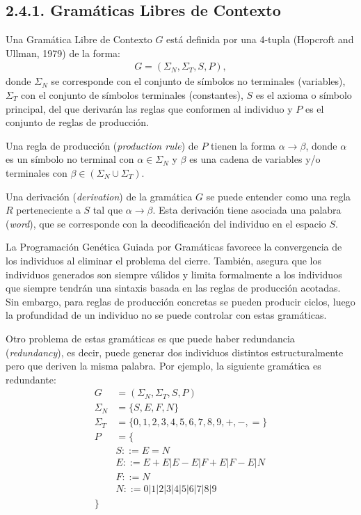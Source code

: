 \documentclass[spanish,a4paper,12pt,twoside]{report}
\begin{document}
    \subsection*{\large 2.4.1. Gramáticas Libres de Contexto}
    Una Gramática Libre de Contexto $G$ está definida por una 4-tupla (Hopcroft and Ullman, 1979) de la forma: 
    \begin{align}
    G = (\Sigma_{N}, \Sigma_{T}, S, P), \label{eq:1}\tag{1}
    \end{align}
    donde $\Sigma_{N}$ se corresponde con el conjunto de símbolos no terminales (variables), $\Sigma_{T}$ con el conjunto de símbolos terminales (constantes), $S$ es el axioma o símbolo principal, del que derivarán las reglas que conformen al individuo y $P$ es el conjunto de reglas de producción. \par
    Una regla de producción (\emph{production rule}) de $P$ tienen la forma $\alpha \rightarrow \beta$, donde $\alpha$ es un símbolo no terminal con $\alpha \in \Sigma_{N}$ y $\beta$ es una cadena de variables y/o terminales con $\beta \in (\Sigma_{N} \cup \Sigma_{T})$. \par
    Una derivación (\emph{derivation}) de la gramática $G$ se puede entender como una regla $R$ perteneciente a $S$ tal que $\alpha \rightarrow \beta$. Esta derivación tiene asociada una palabra (\emph{word}), que se corresponde con la decodificación del individuo en el espacio $S$. \par
    La Programación Genética Guiada por Gramáticas favorece la convergencia de los individuos al eliminar el problema del cierre. También, asegura que los individuos generados son siempre válidos y limita formalmente a los individuos que siempre tendrán una sintaxis basada en las reglas de producción acotadas. Sin embargo, para reglas de producción concretas se pueden producir ciclos, luego la profundidad de un individuo no se puede controlar con estas gramáticas. \par
    Otro problema de estas gramáticas es que puede haber redundancia (\emph{redundancy}), es decir, puede generar dos individuos distintos estructuralmente pero que deriven la misma palabra. Por ejemplo, la siguiente gramática es redundante: \\
    \begin{align*}
    G &= (\Sigma_{N}, \Sigma_{T}, S, P) \label{eq:2}\tag{2} \\
    \Sigma_{N} &= \{S, E, F, N\} \\
    \Sigma_{T} &= \{0, 1, 2, 3, 4, 5, 6, 7, 8, 9, +, -, =\} \\
    P &= \{ \\
    &S ::= E = N \\
    &E ::= E + E | E - E | F + E | F - E | N \\
    &F ::= N \\
    &N ::= 0 | 1 | 2 | 3 | 4 | 5 | 6 | 7 | 8 | 9 \\
    \}
    \end{align*} \par
\end{document}
